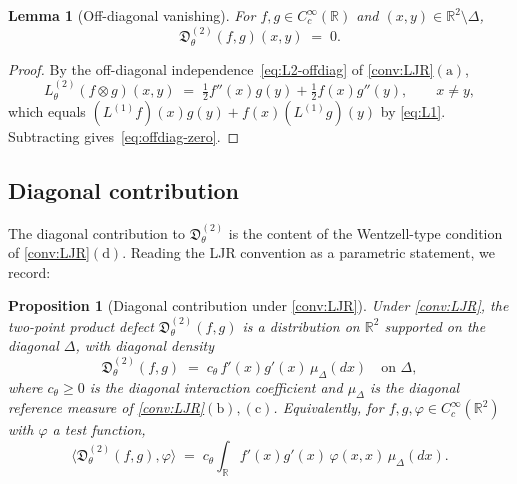 \documentclass[11pt,reqno]{amsart}
\theoremstyle{plain}
\newtheorem{proposition}[theorem]{Proposition}
\newtheorem{lemma}[theorem]{Lemma}
\theoremstyle{definition}
\theoremstyle{remark}
\newcommand{\R}{\mathbb{R}}
\begin{document}
\begin{lemma}[Off-diagonal vanishing]\label{lem:offdiag}
For $f,g\in C_{c}^{\infty}(\R)$ and $(x,y)\in\R^{2}\setminus\Delta$,
\begin{equation}\label{eq:offdiag-zero}
  \mathfrak D^{(2)}_{\theta}(f,g)(x,y)\;=\;0.
\end{equation}
\end{lemma}

\begin{proof}
By the off-diagonal independence~\eqref{eq:L2-offdiag} of
\cref{conv:LJR}$(\mathrm a)$,
\[
  L^{(2)}_{\theta}(f\otimes g)(x,y)
  \;=\;\tfrac{1}{2}f''(x)g(y)+\tfrac{1}{2}f(x)g''(y),
  \qquad x\neq y,
\]
which equals $(L^{(1)}f)(x)g(y)+f(x)(L^{(1)}g)(y)$ by
\eqref{eq:L1}. Subtracting gives~\eqref{eq:offdiag-zero}.
\end{proof}

\subsection{Diagonal contribution}\label{sec:diag-contribution}

The diagonal contribution to $\mathfrak D^{(2)}_{\theta}$ is the
content of the Wentzell-type condition of
\cref{conv:LJR}$(\mathrm d)$. Reading the LJR convention as a
parametric statement, we record:

\begin{proposition}[Diagonal contribution under \cref{conv:LJR}]\label{prop:diag-contribution}
Under \cref{conv:LJR}, the two-point product defect
$\mathfrak D^{(2)}_{\theta}(f,g)$ is a distribution on $\R^{2}$
supported on the diagonal $\Delta$, with diagonal density
\begin{equation}\label{eq:Dgamma-diag}
  \mathfrak D^{(2)}_{\theta}(f,g)
  \;=\;c_{\theta}\,f'(x)g'(x)\,\mu_{\Delta}(dx)
  \quad\text{on }\Delta,
\end{equation}
where $c_{\theta}\ge 0$ is the diagonal interaction coefficient
and $\mu_{\Delta}$ is the diagonal reference measure of
\cref{conv:LJR}$(\mathrm b),(\mathrm c)$. Equivalently, for
$f,g,\varphi\in C_{c}^{\infty}(\R^{2})$ with
$\varphi$ a test function,
\begin{equation}\label{eq:Dgamma-pairing}
  \langle\mathfrak D^{(2)}_{\theta}(f,g),\varphi\rangle
  \;=\;c_{\theta}\!\int_{\R}\!f'(x)g'(x)\,\varphi(x,x)\,\mu_{\Delta}(dx).
\end{equation}
\end{proposition}
\end{document}
